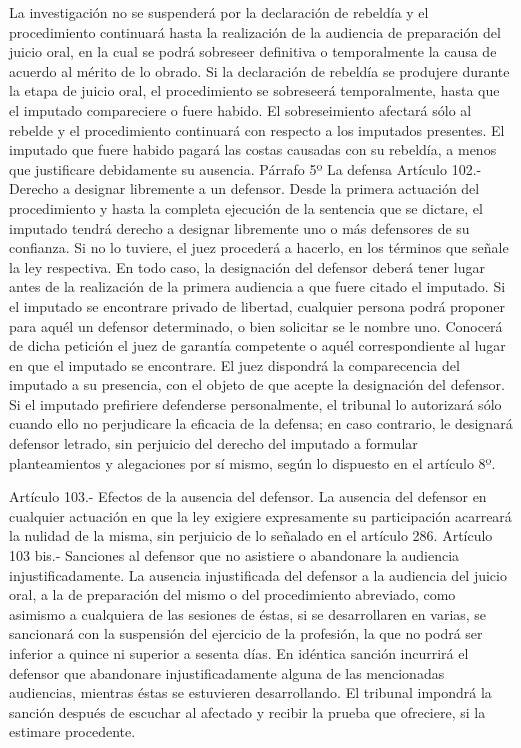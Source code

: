     La investigación no se suspenderá por la declaración de rebeldía y el procedimiento continuará hasta la realización de la audiencia de preparación del juicio oral, en la cual se podrá sobreseer definitiva o temporalmente la causa de acuerdo al mérito de lo obrado. Si la declaración de rebeldía se produjere durante la etapa de juicio oral, el procedimiento se sobreseerá temporalmente, hasta que el imputado compareciere o fuere habido.
    El sobreseimiento afectará sólo al rebelde y el procedimiento continuará con respecto a los imputados presentes.
    El imputado que fuere habido pagará las costas causadas con su rebeldía, a menos que justificare debidamente su ausencia.
    Párrafo 5º La defensa
    Artículo 102.- Derecho a designar libremente a un defensor. Desde la primera actuación del procedimiento y hasta la completa ejecución de la sentencia que se dictare, el imputado tendrá derecho a designar libremente uno o más defensores de su confianza. Si no lo tuviere, el juez procederá a hacerlo, en los términos que señale la ley respectiva. En todo caso, la designación del defensor deberá tener lugar antes de la realización de la primera audiencia a que fuere citado el imputado.
    Si el imputado se encontrare privado de libertad, cualquier persona podrá proponer para aquél un defensor determinado, o bien solicitar se le nombre uno. Conocerá de dicha petición el juez de garantía competente o aquél correspondiente al lugar en que el imputado se encontrare.
    El juez dispondrá la comparecencia del imputado a su presencia, con el objeto de que acepte la designación del defensor.
    Si el imputado prefiriere defenderse personalmente, el tribunal lo autorizará sólo cuando ello no perjudicare la eficacia de la defensa; en caso contrario, le designará defensor letrado, sin perjuicio del derecho del imputado a formular planteamientos y alegaciones por sí mismo, según lo dispuesto en el artículo 8º.

    Artículo 103.- Efectos de la ausencia del defensor. La ausencia del defensor en cualquier actuación en que la ley exigiere expresamente su participación acarreará la nulidad de la misma, sin perjuicio de lo señalado en el artículo 286.
    Artículo 103 bis.- Sanciones al defensor que no asistiere o abandonare la audiencia injustificadamente. La ausencia injustificada del defensor a la audiencia del juicio oral, a la de preparación del mismo o del procedimiento abreviado, como asimismo a cualquiera de las sesiones de éstas, si se desarrollaren en varias, se sancionará con la suspensión del ejercicio de la profesión, la que no podrá ser inferior a quince ni superior a sesenta días. En idéntica sanción incurrirá el defensor que abandonare injustificadamente alguna de las mencionadas audiencias, mientras éstas se estuvieren desarrollando.
    El tribunal impondrá la sanción después de escuchar al afectado y recibir la prueba que ofreciere, si la estimare procedente.


